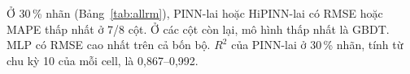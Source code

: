 Ở 30\,\% nhãn (Bảng~\ref{tab:allrm}), PINN-lai hoặc HiPINN-lai có RMSE hoặc MAPE thấp nhất ở 7/8 cột. Ở các cột còn lại, mô hình thấp nhất là GBDT. MLP có RMSE cao nhất trên cả bốn bộ. $R^2$ của PINN-lai ở 30\,\% nhãn, tính từ chu kỳ 10 của mỗi cell, là 0{,}867--0{,}992.
